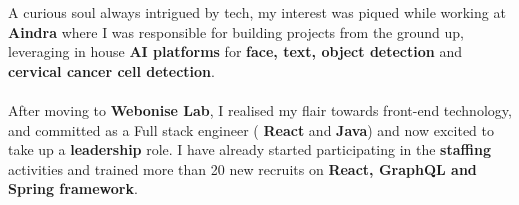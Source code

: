 \documentclass[10pt,a4paper,ragged2e,withhyper]{altacv}
\begin{document}
\begin{paracol}{2}


A curious soul always intrigued by tech, my interest was piqued while working at \textbf{Aindra} where I was responsible for building projects from the ground up, leveraging in house \textbf{AI platforms} for \textbf{face, text, object detection} and \textbf{cervical cancer cell detection}.\\~\\

After moving to \textbf{Webonise Lab}, I realised my flair towards front-end technology, and committed as a Full stack engineer ( \textbf{React} and \textbf{Java}) and now excited to take up a \textbf{leadership} role. I have already started participating in the \textbf{staffing} activities and trained more than 20 new recruits on \textbf{React, GraphQL and Spring framework}.












\end{paracol}
\end{document}
